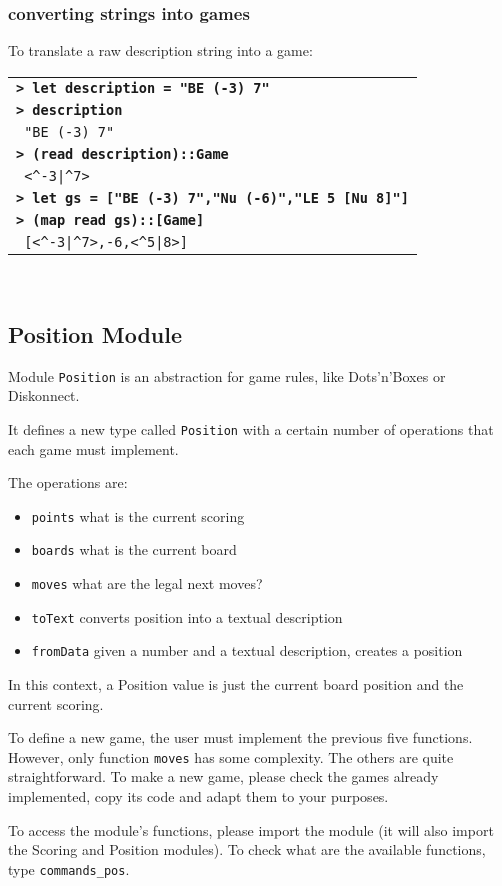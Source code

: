 \documentclass[a4paper,12pt]{article}
\newcommand{\bash}[1]{\small\textbf{\lstinline§> #1§}\\}
\newcommand{\out}[1]{\small\lstinline§ #1§}
\newcommand{\haskellCode}{\fontfamily{pcr}\selectfont}
\newenvironment{sgcode}
	{ \haskellCode
	  \begin{tabular}{|p{0.9\textwidth}|}
      \hline	
	}
	{ \\\hline  
      \end{tabular} \\
	  \par 
	}
\begin{document}
\subsubsection{converting strings into games}

To translate a raw description string into a game:

\begin{sgcode}
\bash{let description = "BE (-3) 7"}
\bash{description}
\out{"BE (-3) 7"} \\
\bash{(read description)::Game}
\out{<^-3|^7>} \\
\bash{let gs = ["BE (-3) 7","Nu (-6)","LE 5 [Nu 8]"]}
\bash{(map read gs)::[Game]}
\out{[<^-3|^7>,-6,<^5|8>]} 
\end{sgcode}

\subsection{Position Module}

Module \verb|Position| is an abstraction for game rules, like Dots'n'Boxes or Diskonnect.

It defines a new type called \verb|Position| with a certain number of operations 
that each game must implement. 

The operations are:

\begin{itemize} \setlength\itemsep{0.1em}
  \item \verb|points| what is the current scoring
  \item \verb|boards| what is the current board
  \item \verb|moves| what are the legal next moves?
  \item \verb|toText| converts position into a textual description
  \item \verb|fromData| given a number and a textual description, creates a position
\end{itemize}

In this context, a Position value is just the current board position and the current scoring.

To define a new game, the user must implement the previous five functions. However, only function
\verb!moves! has some complexity. The others are quite straightforward. To make a new game, please check the games
already implemented, copy its code and adapt them to your purposes.

To access the module's functions, please import the module (it will also import the Scoring and Position modules). To check what are the available functions, type \verb!commands_pos!.
\end{document}
